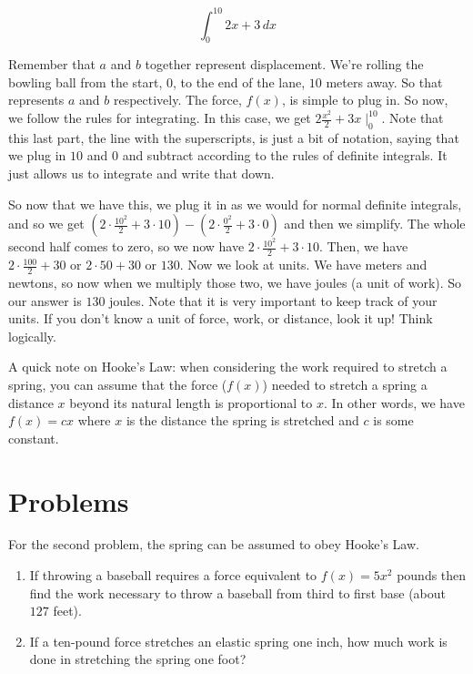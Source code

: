 \documentclass[12pt]{article}
\begin{document}
\begin{equation*}
    \int^{10}_0 2x+3 \, dx
\end{equation*}

Remember that $a$ and $b$ together represent displacement. 
We're rolling the bowling ball from the start, $0$, to the end of the lane, $10$ meters away. 
So that represents $a$ and $b$ respectively. 
The force, $f(x)$, is simple to plug in. 
So now, we follow the rules for integrating. 
In this case, we get $2\frac{x^2}{2}+3x\mid^{10}_0$. 
Note that this last part, the line with the superscripts, is just a bit of notation, saying that we plug in $10$ and $0$ and subtract according to the rules of definite integrals. 
It just allows us to integrate and write that down. 

So now that we have this, we plug it in as we would for normal definite integrals, and so we get $(2\cdot\frac{10^2}{2}+3\cdot 10) - (2\cdot\frac{0^2}{2}+3\cdot 0)$ and then we simplify. 
The whole second half comes to zero, so we now have $2\cdot\frac{10^2}{2}+3\cdot 10$. 
Then, we have $2\cdot \frac{100}{2}+ 30$ or $2\cdot 50 + 30$ or $130$. 
Now we look at units. 
We have meters and newtons, so now when we multiply those two, we have joules (a unit of work). 
So our answer is $130$ joules. 
Note that it is very important to keep track of your units. If you don't know a unit of force, work, or distance, look it up! Think logically.

A quick note on Hooke's Law: when considering the work required to stretch a spring, you can assume that the force ($f(x)$) needed to stretch a spring a distance $x$ beyond its natural length is proportional to $x$. 
In other words, we have $f(x) = cx$ where $x$ is the distance the spring is stretched and $c$ is some constant.

\section{Problems}
For the second problem, the spring can be assumed to obey Hooke's Law.

\begin{enumerate}
    \item If throwing a baseball requires a force equivalent to $f(x) = 5x^2$ pounds then find the work necessary to throw a baseball from third to first base (about $127$ feet).
    \item If a ten-pound force stretches an elastic spring one inch, how much work is done in stretching the spring one foot?
\end{enumerate}
\end{document}
